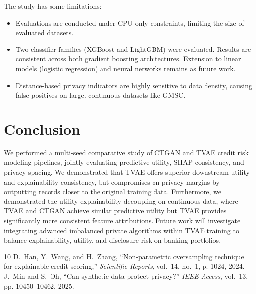 \documentclass[journal]{IEEEtran}
\begin{document}
The study has some limitations:
\begin{itemize}
    \item Evaluations are conducted under CPU-only constraints, limiting the size of evaluated datasets.
    \item Two classifier families (XGBoost and LightGBM) were evaluated. Results are consistent across both gradient boosting architectures. Extension to linear models (logistic regression) and neural networks remains as future work.
    \item Distance-based privacy indicators are highly sensitive to data density, causing false positives on large, continuous datasets like GMSC.
\end{itemize}

\section{Conclusion}
\label{sec:conclusion}
We performed a multi-seed comparative study of CTGAN and TVAE credit risk modeling pipelines, jointly evaluating predictive utility, SHAP consistency, and privacy spacing. We demonstrated that TVAE offers superior downstream utility and explainability consistency, but compromises on privacy margins by outputting records closer to the original training data. Furthermore, we demonstrated the utility-explainability decoupling on continuous data, where TVAE and CTGAN achieve similar predictive utility but TVAE provides significantly more consistent feature attributions. Future work will investigate integrating advanced imbalanced private algorithms within TVAE training to balance explainability, utility, and disclosure risk on banking portfolios.


\begin{thebibliography}{10}
D.~Han, Y.~Wang, and H.~Zhang, ``Non-parametric oversampling technique for explainable credit scoring,'' \emph{Scientific Reports}, vol.~14, no.~1, p. 1024, 2024.
J.~Min and S.~Oh, ``Can synthetic data protect privacy?'' \emph{IEEE Access}, vol.~13, pp. 10450--10462, 2025.
\end{thebibliography}
\end{document}
